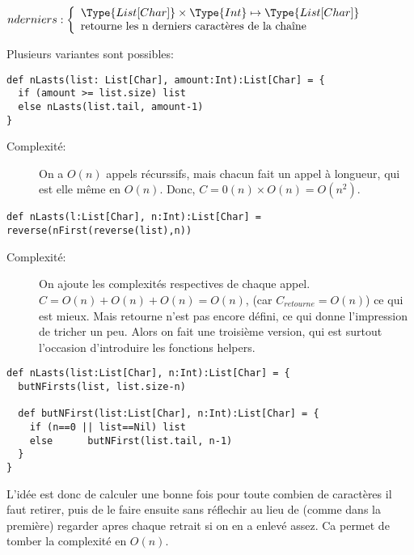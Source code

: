 \documentclass[10pt]{article}\usepackage[correction,nu]{esial}
\begin{document}
\begin{Question}
  $nderniers: \left\{
    \begin{array}{l}
      \Type{List[Char]}\times\Type{Int}\mapsto \Type{List[Char]}\\
      \text{retourne les n derniers caractères de la chaîne}
    \end{array}\right.$  
\end{Question}
\begin{Reponse}
  Plusieurs variantes sont possibles:
  \begin{Verbatim}[label=version naive]
def nLasts(list: List[Char], amount:Int):List[Char] = {
  if (amount >= list.size) list
  else nLasts(list.tail, amount-1)
}    
  \end{Verbatim}
  \begin{description}
  \item[Complexité:] On a $O(n)$ appels récurssifs, mais chacun fait un appel à
    longueur, qui est elle même en $O(n)$. Donc, $C=0(n)\times
    O(n)=O(n^2)$. 
  \end{description}

  \begin{Verbatim}[label=avec retourne]
def nLasts(l:List[Char], n:Int):List[Char] = reverse(nFirst(reverse(list),n))
  \end{Verbatim}
  \begin{description}
  \item[Complexité:] On ajoute les complexités respectives de chaque appel. $C =
    O(n) + O(n) + O(n) = O(n)$, (car $C_{retourne}=O(n)$) ce qui est mieux. Mais
    retourne n'est pas encore défini, ce qui donne l'impression de tricher un
    peu. Alors on fait une troisième version, qui est surtout l'occasion
    d'introduire les fonctions helpers.
  \end{description}

  \begin{Verbatim}[label=avec fonction d'aide]
def nLasts(list:List[Char], n:Int):List[Char] = {
  butNFirsts(list, list.size-n) 

  def butNFirst(list:List[Char], n:Int):List[Char] = {
    if (n==0 || list==Nil) list
    else      butNFirst(list.tail, n-1)
  }
}
  \end{Verbatim}

  L'idée est donc de calculer une bonne fois pour toute combien de caractères
  il faut retirer, puis de le faire ensuite sans réflechir au lieu de (comme
  dans la première) regarder apres chaque retrait si on en a enlevé assez. Ca
  permet de tomber la complexité en $O(n)$.
\end{Reponse}
\end{document}
